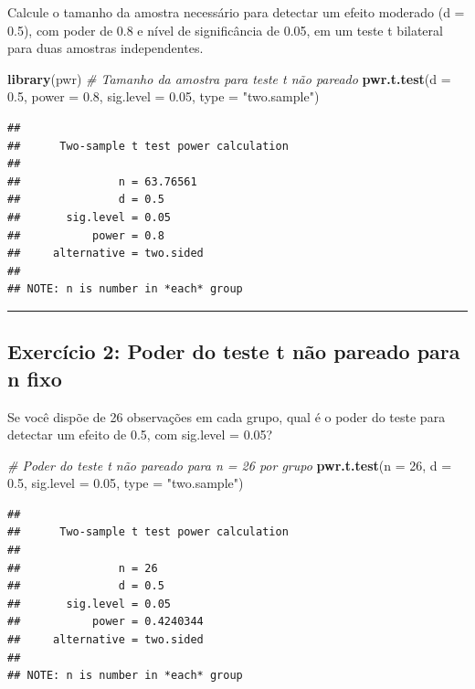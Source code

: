 \documentclass[
]{book}
\newenvironment{Shaded}{\begin{snugshade}}{\end{snugshade}}
\newcommand{\AttributeTok}[1]{\textcolor[rgb]{0.13,0.29,0.53}{#1}}
\newcommand{\CommentTok}[1]{\textcolor[rgb]{0.56,0.35,0.01}{\textit{#1}}}
\newcommand{\DecValTok}[1]{\textcolor[rgb]{0.00,0.00,0.81}{#1}}
\newcommand{\FloatTok}[1]{\textcolor[rgb]{0.00,0.00,0.81}{#1}}
\newcommand{\FunctionTok}[1]{\textcolor[rgb]{0.13,0.29,0.53}{\textbf{#1}}}
\newcommand{\NormalTok}[1]{#1}
\newcommand{\StringTok}[1]{\textcolor[rgb]{0.31,0.60,0.02}{#1}}
\begin{document}
Calcule o tamanho da amostra necessário para detectar um efeito moderado (d = 0.5), com poder de 0.8 e nível de significância de 0.05, em um teste t bilateral para duas amostras independentes.

\begin{Shaded}
\begin{Highlighting}[]
\FunctionTok{library}\NormalTok{(pwr)}
\CommentTok{\# Tamanho da amostra para teste t não pareado}
\FunctionTok{pwr.t.test}\NormalTok{(}\AttributeTok{d =} \FloatTok{0.5}\NormalTok{, }\AttributeTok{power =} \FloatTok{0.8}\NormalTok{, }\AttributeTok{sig.level =} \FloatTok{0.05}\NormalTok{, }\AttributeTok{type =} \StringTok{"two.sample"}\NormalTok{)}
\end{Highlighting}
\end{Shaded}

\begin{verbatim}
## 
##      Two-sample t test power calculation 
## 
##               n = 63.76561
##               d = 0.5
##       sig.level = 0.05
##           power = 0.8
##     alternative = two.sided
## 
## NOTE: n is number in *each* group
\end{verbatim}

\begin{center}\rule{0.5\linewidth}{0.5pt}\end{center}

\subsection{Exercício 2: Poder do teste t não pareado para n fixo}\label{exercuxedcio-2-poder-do-teste-t-nuxe3o-pareado-para-n-fixo}

Se você dispõe de 26 observações em cada grupo, qual é o poder do teste para detectar um efeito de 0.5, com sig.level = 0.05?

\begin{Shaded}
\begin{Highlighting}[]
\CommentTok{\# Poder do teste t não pareado para n = 26 por grupo}
\FunctionTok{pwr.t.test}\NormalTok{(}\AttributeTok{n =} \DecValTok{26}\NormalTok{, }\AttributeTok{d =} \FloatTok{0.5}\NormalTok{, }\AttributeTok{sig.level =} \FloatTok{0.05}\NormalTok{, }\AttributeTok{type =} \StringTok{"two.sample"}\NormalTok{)}
\end{Highlighting}
\end{Shaded}

\begin{verbatim}
## 
##      Two-sample t test power calculation 
## 
##               n = 26
##               d = 0.5
##       sig.level = 0.05
##           power = 0.4240344
##     alternative = two.sided
## 
## NOTE: n is number in *each* group
\end{verbatim}
\end{document}
